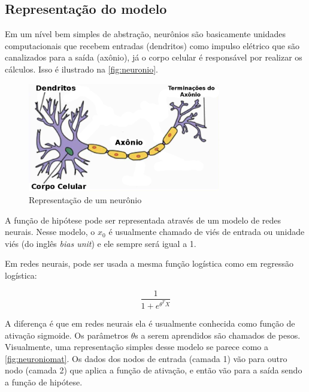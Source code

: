 \subsection{Representação do modelo}

Em um nível bem simples de abstração, neurônios são basicamente unidades computacionais que recebem entradas (dendritos) como impulso elétrico que são canalizados para a saída (axônio), já o corpo celular é responsável por realizar os cálculos. Isso é ilustrado na \autoref{fig:neuronio}.

\begin{figure}
\centering
\caption{Representação de um neurônio} \label{fig:neuronio}
\includegraphics[width=0.75\textwidth]{img/neuron}
\end{figure}


A função de hipótese pode ser representada através de um modelo de redes neurais. Nesse modelo, o $x_0$ é usualmente chamado de viés de entrada ou unidade viés (do inglês \textit{bias unit}) e ele sempre será igual a 1.

Em redes neurais, pode ser usada a mesma função logística como em regressão logística:

\begin{equation}
\frac{1}{1 + e^{\theta^TX}} \nonumber
\end{equation}

A diferença é que em redes neurais ela é usualmente conhecida como função de ativação sigmoide. Os parâmetros $\theta$s a serem aprendidos são chamados de pesos. Visualmente, uma representação simples desse modelo se parece como a \autoref{fig:neuroniomat}. Os dados dos nodos de entrada (camada 1) vão para outro nodo (camada 2) que aplica a função de ativação, e então vão para a saída sendo a função de hipótese.

